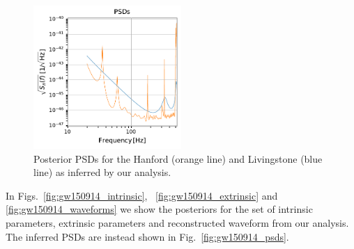 \documentclass{aa}
\begin{document}
%

\begin{figure}
	\caption{Posterior PSDs for the Hanford (orange line) and Livingstone (blue line) as inferred by our analysis.}
	\label{fig:gw150914_psd}
	\includegraphics[width=0.5\textwidth,keepaspectratio]{Images/gw150914/noise_curves.pdf}
\end{figure}

In Figs.~\ref{fig:gw150914_intrinsic}, ~\ref{fig:gw150914_extrinsic} and \ref{fig:gw150914_waveforms} we show the posteriors for the set of intrinsic parameters, extrinsic parameters and reconstructed waveform from our analysis. The inferred PSDs are instead shown in Fig.~\ref{fig:gw150914_psds}. %
\end{document}
